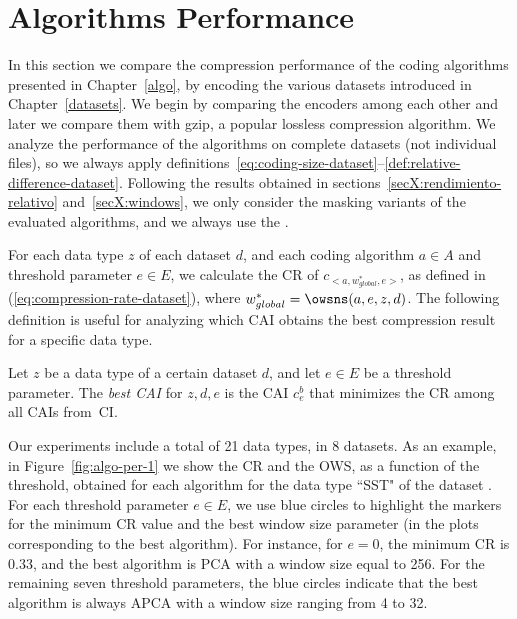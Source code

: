 
\section{Algorithms Performance}
\label{secX:codersmask}


In this section we compare the compression performance of the coding algorithms presented in Chapter~\ref{algo}, by encoding the various datasets introduced in Chapter~\ref{datasets}. We begin by comparing the encoders among each other and later we compare them with gzip, a popular lossless compression algorithm. We analyze the performance of the algorithms on complete datasets (not individual files), so we always apply definitions~\ref{eq:coding-size-dataset}--\ref{def:relative-difference-dataset}. Following the results obtained in sections~\ref{secX:rendimiento-relativo} and~\ref{secX:windows}, we only consider the masking variants of the evaluated algorithms, and we always use the \owsns.


For each data type $z$ of each dataset $d$, and each coding algorithm $a \in A$ and threshold parameter $e \in E$, we calculate the CR of $c_{<a, w_{global}^{*}, e>}$, as defined in (\ref{eq:compression-rate-dataset}), where $w_{global}^{*}=\owsns(a, e, z, d)$. The following definition is useful for analyzing which CAI obtains the best compression result for a specific data type.


\begin{defcion}
\label{eq:bestcai}
Let $z$ be a data type of a certain dataset $d$, and let $e \in E$ be a threshold parameter. The \textit{best CAI} for $z, d, e$ is the CAI $c^{b}_{e}$ that minimizes the CR among all CAIs from~CI.
\end{defcion}


Our experiments include a total of 21 data types, in 8 datasets. As an example, in Figure~\ref{fig:algo-per-1} we show the CR and the OWS, as a function of the threshold, obtained for each algorithm for the data type ``SST" of the dataset \datasetelnino. For each threshold parameter $e \in E$, we use blue circles to highlight the markers for the minimum CR value and the best window size parameter (in the plots corresponding to the best algorithm). For instance, for $e=0$, the minimum CR is $0.33$, and the best algorithm is PCA with a window size equal to 256. For the remaining seven threshold parameters, the blue circles indicate that the best algorithm is always APCA with a window size ranging from 4 to 32.


\clearpage
{}
\clearpage


